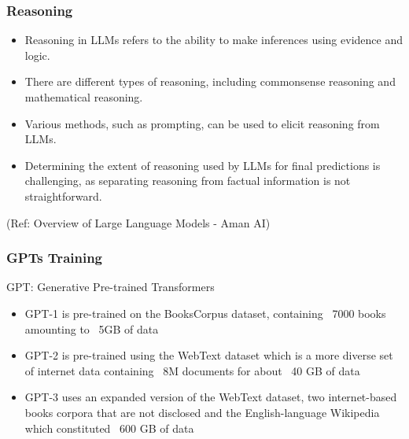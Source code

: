 \begin{frame}[fragile]\frametitle{Reasoning}


\begin{itemize}
\item Reasoning in LLMs refers to the ability to make inferences using evidence and logic.
\item There are different types of reasoning, including commonsense reasoning and mathematical reasoning.
\item Various methods, such as prompting, can be used to elicit reasoning from LLMs.
\item Determining the extent of reasoning used by LLMs for final predictions is challenging, as separating reasoning from factual information is not straightforward.
\end{itemize}

				
{\tiny (Ref: Overview of Large Language Models - Aman AI)}

\end{frame}


\begin{frame}[fragile]\frametitle{GPTs Training}

GPT: Generative Pre-trained Transformers

\begin{itemize}
\item GPT-1 is pre-trained on the BooksCorpus dataset, containing ~7000 books amounting to ~5GB of data
\item GPT-2 is pre-trained using the WebText dataset which is a more diverse set of internet data containing ~8M documents for about ~40 GB of data
\item GPT-3 uses an expanded version of the WebText dataset, two internet-based books corpora that are not disclosed and the English-language Wikipedia which constituted ~600 GB of data
\end{itemize}	 

\end{frame}


